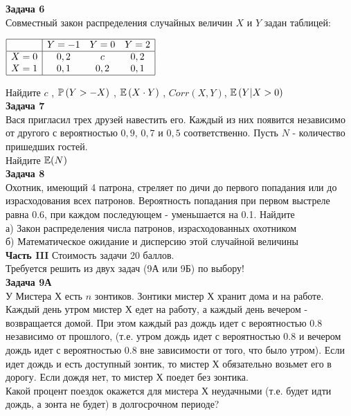 \documentclass[pdftex,12pt,a4paper]{article}
\begin{document}
\textbf{Задача 6} \\ %
Совместный закон распределения случайных величин  $X$  и  $Y$
задан таблицей:

$\begin{array}{|c|ccc|} 
\hline 
{} & {Y=-1} & {Y=0} & {Y=2}\\  
\hline 
{X=0} & {0,2} & {c} & {0,2}\\ 
{X=1} & {0,1} & {0,2} & {0,1} \\  
\hline  
\end{array}$

Найдите  $c$ ,  $\P\left(Y>-X\right)$ ,  $\E\left(X\cdot Y
\right)$ , $Corr(X,Y)$, $\E\left(Y|X>0\right)$ \\

\textbf{Задача 7} \\ %
Вася пригласил трех друзей навестить его. Каждый из них появится
независимо от другого с вероятностью $0,9$, $0,7$ и $0,5$
соответственно. Пусть $N$ - количество пришедших гостей. \\
Найдите $\E(N)$ \\


\textbf{Задача 8} \\ %
Охотник, имеющий 4 патрона, стреляет по дичи до первого
попадания или до израсходования всех патронов. Вероятность
попадания при первом выстреле равна 0.6, при каждом последующем -
уменьшается на 0.1. Найдите \\
а) Закон распределения числа патронов, израсходованных охотником \\
б) Математическое ожидание и дисперсию этой случайной величины \\



\textbf{Часть III} Стоимость задачи 20 баллов. \\

Требуется решить \textbf{} из двух задач (9А или 9Б) по
выбору! \\

\textbf{Задача 9А} \\
У Мистера Х есть $n$ зонтиков. Зонтики мистер Х хранит дома и на работе. Каждый день утром мистер Х едет на работу, а каждый день вечером - возвращается домой. При этом каждый раз дождь идет с вероятностью 0.8 независимо от прошлого, (т.е. утром дождь идет с вероятностью 0.8 и вечером дождь идет с вероятностью 0.8 вне зависимости от того, что было утром). Если идет дождь и есть доступный зонтик, то мистер Х обязательно возьмет его в дорогу. Если дождя нет, то мистер Х поедет без зонтика. \\
Какой процент поездок окажется для мистера Х неудачными (т.е. будет идти дождь, а зонта не будет) в долгосрочном периоде? \\
\end{document}
